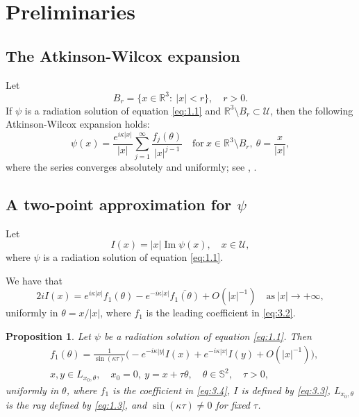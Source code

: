\documentclass[10pt,a4paper]{amsart}
\let\ra\rightarrow
\newcommand{\RR}{\mathbb R}
\renewcommand{\Im}{\mathop{\mathrm{Im}}}
\newtheorem{proposition}{Proposition}
\theoremstyle{definition}
\begin{document}
\section{Preliminaries}\label{sec:3}

\subsection{The Atkinson-Wilcox expansion}

Let
\begin{equation}
\label{eq:3.1}
B_r=\{x\in\RR^3:\ |x|<r\},\quad r>0.
\end{equation}
If $\psi$ is a radiation solution of equation \eqref{eq:1.1} and $\RR^3\setminus B_r \subset \mathcal{U}$, then
the following Atkinson-Wilcox expansion holds:
\begin{equation}
\label{eq:3.2}
\psi(x)=\frac{e^{i\kappa|x|}}{|x|}\sum\limits_{j=1}^{\infty}\frac{f_j(\theta)}{|x|^{j-1}} \quad \text{for}\ x\in \RR^3\setminus B_r,\ \theta=\frac{x}{|x|},
\end{equation}
where the series converges absolutely and uniformly; see \cite{A}, \cite{W}.

\subsection{A two-point approximation for $\psi$}\label{subsec:3.2}

Let
\begin{equation}
\label{eq:3.3}
I(x)=|x|\Im\psi(x),\quad x\in\mathcal{U},
\end{equation}
where $\psi$ is a radiation solution of equation \eqref{eq:1.1}.

We have that
\begin{equation}
\label{eq:3.4}
2iI(x)=e^{i\kappa|x|}f_1(\theta)-e^{-i\kappa|x|} \overline {f_1(\theta)}+O(|x|^{-1})\quad \text{as} \ |x|\ra +\infty,
\end{equation}
uniformly in $\theta=x/|x|$, where $f_1$ is the leading coefficient in \eqref{eq:3.2}.

\begin{proposition}\label{prop:1}
Let $\psi$ be a radiation solution of equation \eqref{eq:1.1}. Then
\begin{equation}\label{eq:3.5}
\begin{aligned}
&f_1(\theta)= \frac{1}{\sin(\kappa\tau)}\bigl(-e^{-i\kappa|y|}I(x)+e^{-i\kappa|x|}I(y)+O(|x|^{-1})\bigr),\\
&x,y\in L_{x_0, \theta},\quad x_0=0,\ y=x+\tau\theta, \quad\theta\in\mathbb S^2,\quad \tau>0,
\end{aligned}
\end{equation}
uniformly in $\theta$, where $f_1$ is the coefficient in \eqref{eq:3.4}, $I$ is defined by \eqref{eq:3.3}, $L_{x_0, \theta}$ is the ray defined by \eqref{eq:1.3},
and $\sin(\kappa\tau)\ne 0$ for fixed $\tau$.
\end{proposition}
\end{document}

